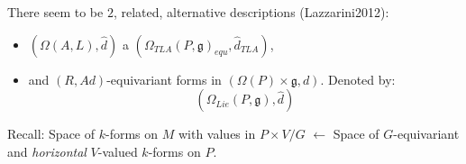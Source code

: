 There seem to be $2$, related, alternative descriptions (Lazzarini2012):
    
    \begin{itemize}
        
    \item $(\Omega(A, L), \hat d)$ a $(\Omega_{TLA}(P, \mathfrak g)_{equ}, \hat d_{TLA})$,
    
    \item and $(R, Ad)$-equivariant forms in $(\Omega(P) \times \mathfrak g, d)$. Denoted by: \[ (\Omega_{Lie}(P, \mathfrak g), \hat d) \]
        
    \end{itemize}

Recall: Space of $k$-forms on $M$ with values in $P \times V/G$ $\longleftarrow$ Space of $G$-equivariant and \emph{horizontal} $V$-valued $k$-forms on $P$.
